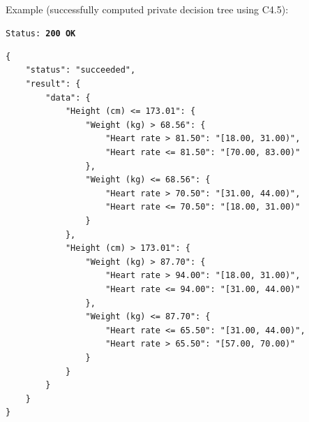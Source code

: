 \begin{description}[labelwidth=5em, leftmargin=\dimexpr\labelwidth+\labelsep\relax]
\ \\
\begin{minipage}{\linewidth}
  Example (successfully computed private decision tree using C4.5):\\
{
\texttt{Status: {\color{ForestGreen}\textbf{200 OK}}}
\begin{verbatim}
{
    "status": "succeeded",
    "result": {
        "data": {
            "Height (cm) <= 173.01": {
                "Weight (kg) > 68.56": {
                    "Heart rate > 81.50": "[18.00, 31.00)",
                    "Heart rate <= 81.50": "[70.00, 83.00)"
                },
                "Weight (kg) <= 68.56": {
                    "Heart rate > 70.50": "[31.00, 44.00)",
                    "Heart rate <= 70.50": "[18.00, 31.00)"
                }
            },
            "Height (cm) > 173.01": {
                "Weight (kg) > 87.70": {
                    "Heart rate > 94.00": "[18.00, 31.00)",
                    "Heart rate <= 94.00": "[31.00, 44.00)"
                },
                "Weight (kg) <= 87.70": {
                    "Heart rate <= 65.50": "[31.00, 44.00)",
                    "Heart rate > 65.50": "[57.00, 70.00)"
                }
            }
        }
    }
}
\end{verbatim}
\label{sc:get-response-sucessful-3}
}
\end{minipage}


\end{description}

